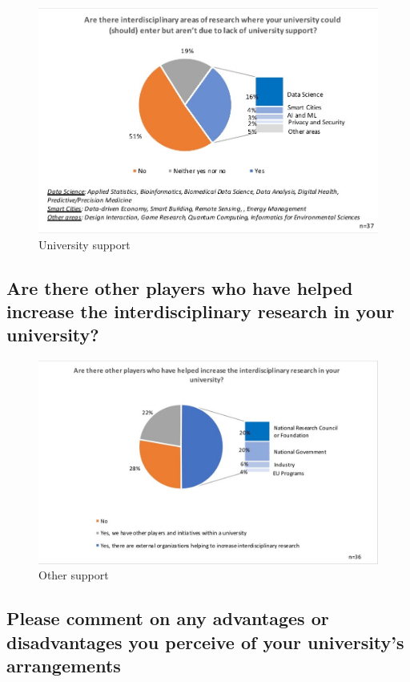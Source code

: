 \begin{figure}[h]
\centering
\includegraphics[width = \linewidth]{charts/1c.jpg}
\caption{University support}
\label{sect1:support}
\end{figure}

\subsection{ Are there other players who have helped increase the
interdisciplinary research in your university?}

\begin{figure}[h]
\centering
\includegraphics[width = \linewidth]{charts/1d.jpg}
\caption{Other support}
\label{sect1:support2}
\end{figure}

\subsection{Please comment on any advantages or disadvantages you perceive
of your university's arrangements}


